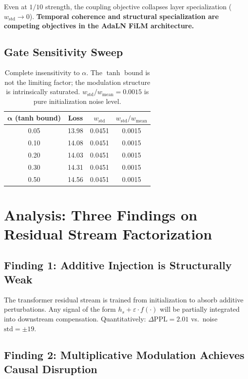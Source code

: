 \documentclass[11pt,a4paper]{article}
\begin{document}
Even at $1/10$ strength, the coupling objective collapses layer specialization
($w_{\mathrm{std}} \to 0$). \textbf{Temporal coherence and structural
specialization are competing objectives in the AdaLN FiLM architecture.}

\subsection{Gate Sensitivity Sweep}

\begin{table}[h]
\centering
\begin{tabular}{cccc}
\toprule
$\boldsymbol{\alpha}$ (tanh bound) & \textbf{Loss} & $w_{\mathrm{std}}$ & $w_{\mathrm{std}}/w_{\mathrm{mean}}$ \\
\midrule
0.05 & 13.98 & 0.0451 & 0.0015 \\
0.10 & 14.08 & 0.0451 & 0.0015 \\
0.20 & 14.03 & 0.0451 & 0.0015 \\
0.30 & 14.31 & 0.0451 & 0.0015 \\
0.50 & 14.56 & 0.0451 & 0.0015 \\
\bottomrule
\end{tabular}
\caption{Complete insensitivity to $\alpha$. The $\tanh$ bound is not the limiting
factor; the modulation structure is intrinsically saturated.
$w_{\mathrm{std}}/w_{\mathrm{mean}} = 0.0015$ is pure initialization noise level.}
\end{table}

\section{Analysis: Three Findings on Residual Stream Factorization}

\subsection{Finding 1: Additive Injection is Structurally Weak}

The transformer residual stream is trained from initialization to absorb additive
perturbations. Any signal of the form $h_s + \varepsilon \cdot f(\cdot)$ will be
partially integrated into downstream compensation. Quantitatively:
$\Delta\mathrm{PPL} = 2.01$ vs.\ noise $\mathrm{std} = \pm 19$.

\subsection{Finding 2: Multiplicative Modulation Achieves Causal Disruption}
\end{document}
